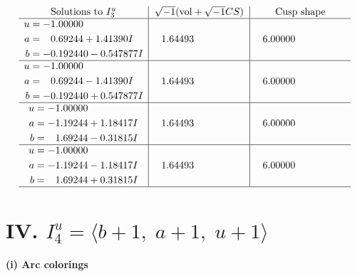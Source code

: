 \documentclass[1p]{elsarticle_modified}
\theoremstyle{definition}
\newcommand{\I}{\sqrt{-1}}
\begin{document}
$$\begin{array}{c|c|c}  
\text{Solutions to }I^u_{3}& \I (\text{vol} + \sqrt{-1}CS) & \text{Cusp shape}\\
 \hline 
\begin{aligned}
u &= -1.00000\phantom{ +0.000000I} \\
a &= \phantom{-}0.69244 + 1.41390 I \\
b &= -0.192440 - 0.547877 I\end{aligned}
 & \phantom{-}1.64493\phantom{ +0.000000I} & \phantom{-}6.00000\phantom{ +0.000000I} \\ \hline\begin{aligned}
u &= -1.00000\phantom{ +0.000000I} \\
a &= \phantom{-}0.69244 - 1.41390 I \\
b &= -0.192440 + 0.547877 I\end{aligned}
 & \phantom{-}1.64493\phantom{ +0.000000I} & \phantom{-}6.00000\phantom{ +0.000000I} \\ \hline\begin{aligned}
u &= -1.00000\phantom{ +0.000000I} \\
a &= -1.19244 + 1.18417 I \\
b &= \phantom{-}1.69244 - 0.31815 I\end{aligned}
 & \phantom{-}1.64493\phantom{ +0.000000I} & \phantom{-}6.00000\phantom{ +0.000000I} \\ \hline\begin{aligned}
u &= -1.00000\phantom{ +0.000000I} \\
a &= -1.19244 - 1.18417 I \\
b &= \phantom{-}1.69244 + 0.31815 I\end{aligned}
 & \phantom{-}1.64493\phantom{ +0.000000I} & \phantom{-}6.00000\phantom{ +0.000000I}\\
 \hline 
 \end{array}$$\newpage\newpage\renewcommand{\arraystretch}{1}
\centering \section*{IV. $I^u_{4}= \langle b+1,\;a+1,\;u+1 \rangle$}
\flushleft \textbf{(i) Arc colorings}\\
\end{document}
